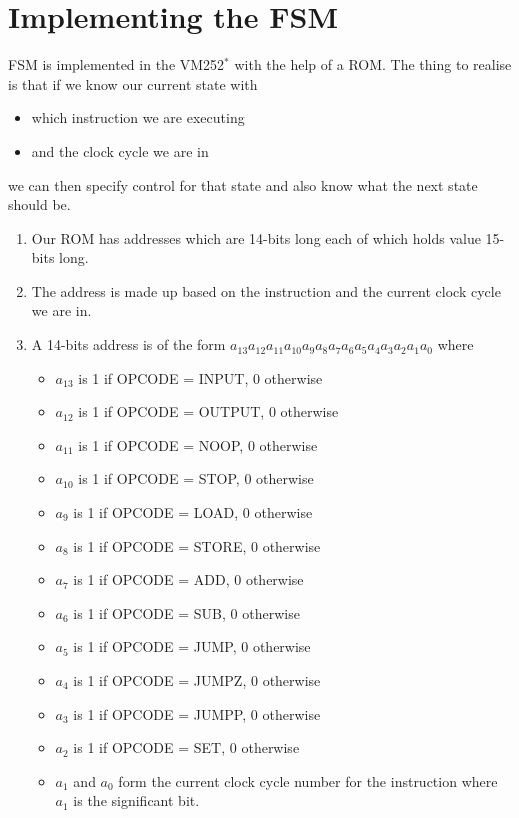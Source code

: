 \documentclass{article}
\begin{document}
\section{Implementing the FSM}
FSM is implemented in the VM252$^*$ with the help of a ROM. The thing to realise is that if we know our current state  with \begin{itemize}
    \item which instruction we are executing
    \item and the clock cycle we are in
\end{itemize}
we can then specify control for that state and also know what the next state should be.
\begin{enumerate}
    \item Our ROM has addresses which are 14-bits long each of which holds value 15-bits long.
    \item The address is made up based on the instruction and the current clock cycle we are in.
    \item A 14-bits address is of the form $a_{13}a_{12}a_{11}a_{10}a_9a_8a_7a_6a_5a_4a_3a_2a_1a_0$ where \begin{itemize}
        \item $a_{13}$ is 1 if OPCODE = INPUT, 0 otherwise
        \item $a_{12}$ is 1 if OPCODE = OUTPUT, 0 otherwise
        \item $a_{11}$ is 1 if OPCODE = NOOP, 0 otherwise
        \item $a_{10}$ is 1 if OPCODE = STOP, 0 otherwise
        \item $a_{9}$ is 1 if OPCODE = LOAD, 0 otherwise
        \item $a_{8}$ is 1 if OPCODE = STORE, 0 otherwise
        \item $a_{7}$ is 1 if OPCODE = ADD, 0 otherwise
        \item $a_{6}$ is 1 if OPCODE = SUB, 0 otherwise
        \item $a_{5}$ is 1 if OPCODE = JUMP, 0 otherwise
        \item $a_{4}$ is 1 if OPCODE = JUMPZ, 0 otherwise
        \item $a_{3}$ is 1 if OPCODE = JUMPP, 0 otherwise
        \item $a_{2}$ is 1 if OPCODE = SET, 0 otherwise
        \item $a_{1}$ and $a_{0}$ form the current clock cycle number for the instruction where $a_{1}$ is the significant bit.
    \end{itemize}

\end{enumerate}
\end{document}
